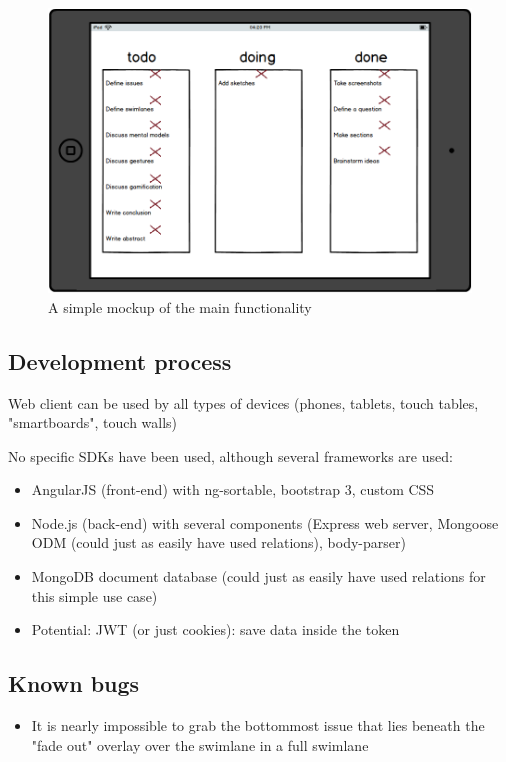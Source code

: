 \begin{figure}[H]
    \label{figure:ipad-mockup}
    \centerline{\includegraphics[scale=0.3]{images/mockup}}
    \caption{A simple mockup of the main functionality}   
\end{figure}




\subsection{Development process}

Web client can be used by all types of devices (phones, tablets, touch tables, "smartboards", touch walls)

No specific SDKs have been used, although several frameworks are used:
\begin{itemize}
  \item AngularJS (front-end) with ng-sortable, bootstrap 3, custom CSS
  \item Node.js (back-end) with several components (Express web server, Mongoose ODM (could just as easily have used relations), body-parser)
  \item MongoDB document database (could just as easily have used relations for this simple use case)
  \item Potential: JWT (or just cookies): save data inside the token
\end{itemize}

\subsection{Known bugs}

\begin{itemize}
  \item It is nearly impossible to grab the bottommost issue that lies beneath the "fade out" overlay over the swimlane in a full swimlane
\end{itemize}
